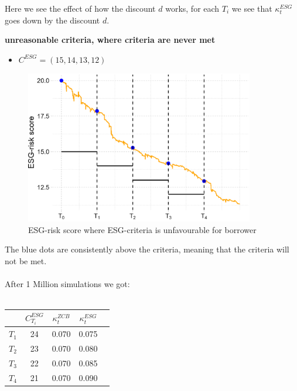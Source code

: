 Here we see the effect of how the discount $d$ works, for each $T_{i}$ we see that $\kappa_{t}^{ESG}$ goes down by the discount $d$. 

\newpage 
\textbf{unreasonable criteria, where criteria are never met}
\begin{itemize}
    \item $C^{ESG} = (15, 14, 13, 12)$
\end{itemize}

\begin{figure}[htp]
    \centering
    \includegraphics[width= 10cm]{figures/ESG/ESG_plt_criteria3.png}
    \caption{ESG-risk score where ESG-criteria is unfavourable for borrower}
    \label{fig: ESG_risk_criteria_3}
\end{figure} 

The blue dots are consistently above the criteria, meaning that the criteria will not be met. 
\\~\\ 
After 1 Million simulations we got:
\\~\\
\begin{center}
\begin{tabular}{lcccl}
\toprule
           &$C_{T_{i}}^{ESG}$ & $\kappa_{t}^{ZCB}$  & $\kappa_{t}^{ESG}$ \\
\midrule
$T_{1}$ &  24 & 0.070 & 0.075 \\
$T_{2}$ &  23 & 0.070 & 0.080 \\
$T_{3}$ &  22 & 0.070 & 0.085 \\
$T_{4}$ &  21 & 0.070 & 0.090 \\
\bottomrule
\end{tabular}
\end{center}

